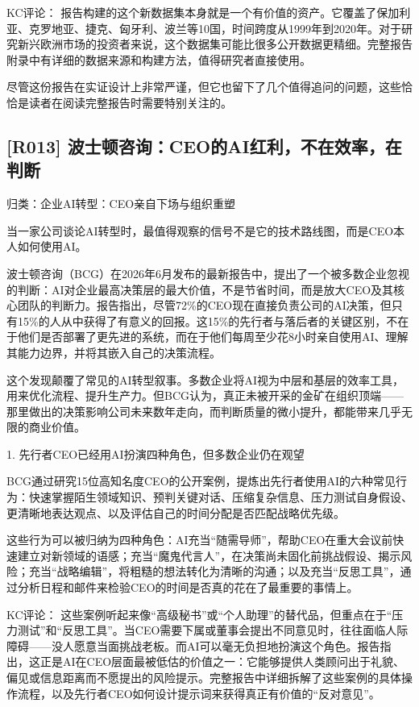 \documentclass[11pt]{ctexart}
\begin{document}
KC评论： 报告构建的这个新数据集本身就是一个有价值的资产。它覆盖了保加利亚、克罗地亚、捷克、匈牙利、波兰等10国，时间跨度从1999年到2020年。对于研究新兴欧洲市场的投资者来说，这个数据集可能比很多公开数据更精细。完整报告附录中有详细的数据来源和构建方法，值得研究者直接使用。

尽管这份报告在实证设计上非常严谨，但它也留下了几个值得追问的问题，这些恰恰是读者在阅读完整报告时需要特别关注的。

\subsection{[R013] 波士顿咨询：CEO的AI红利，不在效率，在判断}
{\small\color{refgray}归类：企业AI转型：CEO亲自下场与组织重塑}

当一家公司谈论AI转型时，最值得观察的信号不是它的技术路线图，而是CEO本人如何使用AI。

波士顿咨询（BCG）在2026年6月发布的最新报告中，提出了一个被多数企业忽视的判断：AI对企业最高决策层的最大价值，不是节省时间，而是放大CEO及其核心团队的判断力。报告指出，尽管72\%的CEO现在直接负责公司的AI决策，但只有15\%的人从中获得了有意义的回报。这15\%的先行者与落后者的关键区别，不在于他们是否部署了更先进的系统，而在于他们每周至少花8小时亲自使用AI、理解其能力边界，并将其嵌入自己的决策流程。

这个发现颠覆了常见的AI转型叙事。多数企业将AI视为中层和基层的效率工具，用来优化流程、提升生产力。但BCG认为，真正未被开采的金矿在组织顶端——那里做出的决策影响公司未来数年走向，而判断质量的微小提升，都能带来几乎无限的商业价值。

1. 先行者CEO已经用AI扮演四种角色，但多数企业仍在观望

BCG通过研究15位高知名度CEO的公开案例，提炼出先行者使用AI的六种常见行为：快速掌握陌生领域知识、预判关键对话、压缩复杂信息、压力测试自身假设、更清晰地表达观点、以及评估自己的时间分配是否匹配战略优先级。

这些行为可以被归纳为四种角色：AI充当“随需导师”，帮助CEO在重大会议前快速建立对新领域的语感；充当“魔鬼代言人”，在决策尚未固化前挑战假设、揭示风险；充当“战略编辑”，将粗糙的想法转化为清晰的沟通；以及充当“反思工具”，通过分析日程和邮件来检验CEO的时间是否真的花在了最重要的事情上。

KC评论： 这些案例听起来像“高级秘书”或“个人助理”的替代品，但重点在于“压力测试”和“反思工具”。当CEO需要下属或董事会提出不同意见时，往往面临人际障碍——没人愿意当面挑战老板。而AI可以毫无负担地扮演这个角色。报告指出，这正是AI在CEO层面最被低估的价值之一：它能够提供人类顾问出于礼貌、偏见或信息距离而不愿提出的风险提示。完整报告中详细拆解了这些案例的具体操作流程，以及先行者CEO如何设计提示词来获得真正有价值的“反对意见”。
\end{document}
